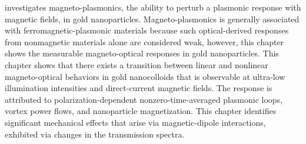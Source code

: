 investigates magneto-plasmonics, the ability to perturb a plasmonic response with magnetic fields, in gold nanoparticles. Magneto-plasmonics is generally associated with ferromagnetic-plasmonic materials because such optical-derived responses from nonmagnetic materials alone are considered weak, however, this chapter shows the measurable magneto-optical responses in gold nanoparticles. This chapter shows that there exists a transition between linear and nonlinear magneto-optical behaviors in gold nanocolloids that is observable at ultra-low illumination intensities and direct-current magnetic fields. The response is attributed to polarization-dependent nonzero-time-averaged plasmonic loops, vortex power flows, and nanoparticle magnetization. This chapter identifies significant mechanical effects that arise via magnetic-dipole interactions, exhibited via changes in the transmission spectra.
